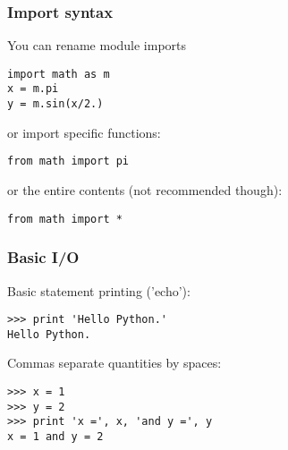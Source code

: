 \documentclass[red]{beamer}
\begin{document}
\begin{frame}[fragile]
    \frametitle{Import syntax}

    You can rename module imports
    \begin{lstlisting}
import math as m
x = m.pi
y = m.sin(x/2.)
    \end{lstlisting}

    or import specific functions:
    \begin{lstlisting}
from math import pi
    \end{lstlisting}

    or the entire contents (not recommended though):
    \begin{lstlisting}
from math import *
    \end{lstlisting}
\end{frame}
\begin{frame}[fragile]
    \frametitle{Basic I/O}
    
    Basic statement printing ('echo'):
    \begin{lstlisting}
>>> print 'Hello Python.'
Hello Python.
    \end{lstlisting}

    Commas separate quantities by spaces:
    \begin{lstlisting}
>>> x = 1
>>> y = 2
>>> print 'x =', x, 'and y =', y
x = 1 and y = 2
    \end{lstlisting}
\end{frame}
\end{document}
